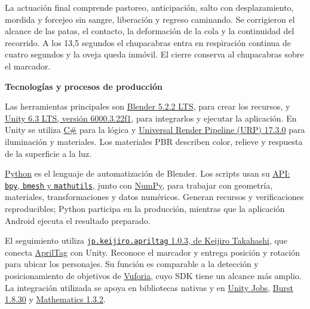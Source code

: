 \documentclass[11pt,letterpaper]{article}
\newcommand{\heading}[1]{\par{\sffamily\bfseries\fontsize{18}{22}\selectfont\color{ink}#1}\par\vspace{5pt}}
\begin{document}
La actuación final comprende pastoreo, anticipación, salto con desplazamiento, mordida y forcejeo sin sangre, liberación y regreso caminando. Se corrigieron el alcance de las patas, el contacto, la deformación de la cola y la continuidad del recorrido. A los 13,5 segundos el chupacabras entra en respiración continua de cuatro segundos y la oveja queda inmóvil. El cierre conserva al chupacabras sobre el marcador.

\newpage
\heading{Tecnologías y procesos de producción}

Las herramientas principales son \href{https://www.blender.org/}{Blender 5.2.2 LTS}, para crear los recursos, y \href{https://docs.unity3d.com/6000.3/Documentation/Manual/}{Unity 6.3 LTS, versión 6000.3.22f1}, para integrarlos y ejecutar la aplicación. En Unity se utiliza \href{https://learn.microsoft.com/es-es/dotnet/csharp/}{C\#} para la lógica y \href{https://docs.unity3d.com/6000.3/Documentation/Manual/urp/urp-introduction.html}{Universal Render Pipeline (URP) 17.3.0} para iluminación y materiales. Los materiales PBR describen color, relieve y respuesta de la superficie a la luz.

\href{https://www.python.org/}{Python} es el lenguaje de automatización de Blender. Los scripts usan su \href{https://docs.blender.org/api/current/index.html}{API: \texttt{bpy}, \texttt{bmesh} y \texttt{mathutils}}, junto con \href{https://numpy.org/doc/stable/}{NumPy}, para trabajar con geometría, materiales, transformaciones y datos numéricos. Generan recursos y verificaciones reproducibles; Python participa en la producción, mientras que la aplicación Android ejecuta el resultado preparado.

El seguimiento utiliza \href{https://github.com/keijiro/jp.keijiro.apriltag}{\texttt{jp.keijiro.apriltag} 1.0.3, de Keijiro Takahashi}, que conecta \href{https://github.com/AprilRobotics/apriltag}{AprilTag} con Unity. Reconoce el marcador y entrega posición y rotación para ubicar los personajes. Su función es comparable a la detección y posicionamiento de objetivos de \href{https://developer.vuforia.com/library/vuforia-engine/getting-started/vuforia-features/}{Vuforia}, cuyo SDK tiene un alcance más amplio. La integración utilizada se apoya en bibliotecas nativas y en \href{https://docs.unity3d.com/6000.3/Documentation/Manual/JobSystem.html}{Unity Jobs}, \href{https://docs.unity3d.com/Packages/com.unity.burst@1.8/manual/index.html}{Burst 1.8.30} y \href{https://docs.unity3d.com/Packages/com.unity.mathematics@1.3/manual/index.html}{Mathematics 1.3.2}.
\end{document}
